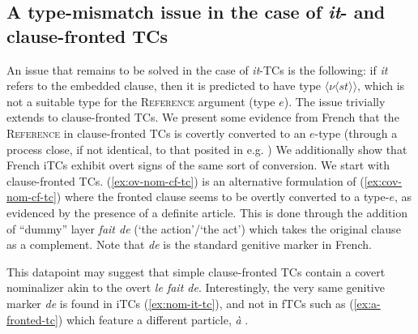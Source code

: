 \documentclass[11pt]{article}
\begin{document}
	\subsection{A type-mismatch issue in the case of \textit{it}- and clause-fronted TCs}\label{app:type-mismatch}
	 An issue that remains to be solved in the case of \textit{it}-TCs is the following: if \textit{it} refers to the embedded clause, then it is predicted to have type $\langle \nu \langle s t\rangle \rangle$, which is not a suitable type for the \textsc{Reference} argument (type $e$). The issue trivially extends to clause-fronted TCs.
	 We present some evidence from French that the \textsc{Reference} in clause-fronted TCs is covertly converted to an $e$-type (through a process close, if not identical, to that posited in e.g. \cite{Fox2003})
	 We additionally show that French iTCs exhibit overt signs of the same sort of conversion.
	 We start with clause-fronted TCs. (\ref{ex:ov-nom-cf-tc}) is an alternative formulation of (\ref{ex:cov-nom-cf-tc}) where the fronted clause seems to be overtly converted to a type-$e$, as evidenced by the presence of a definite article. This is done through the addition of ``dummy'' layer \textit{fait de} (`the action'/`the act') which takes the original clause as a complement. Note that \textit{de} is the standard genitive marker in French.
	\begin{exe}
		\ex 
		\begin{xlist}
			\label{ex:cov-nom-cf-tc}
			\label{ex:ov-nom-cf-tc}
		\end{xlist}
	\end{exe}
	 This datapoint may suggest that simple clause-fronted TCs contain a covert nominalizer akin to the overt \textit{le fait de}.
	 Interestingly, the very same genitive marker \textit{de} is found in iTCs (\ref{ex:nom-it-tc}), and not in fTCs such as (\ref{ex:a-fronted-tc}) which feature a different particle, \textit{à} \cite{Huot1981,Guerin2006,AguilaMultner2022}.
\end{document}

